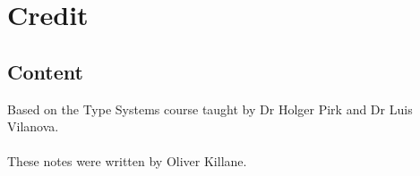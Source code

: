 \chapter{Credit}

\section*{Content}
Based on the Type Systems course taught by Dr Holger Pirk and Dr Luis Vilanova.
\\
\\ These notes were written by Oliver Killane.